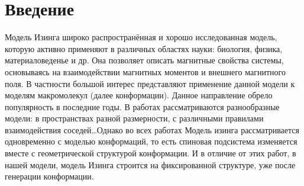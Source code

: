 \section{Введение}
Модель Изинга \cite{ising} широко распространённая и хорошо исследованная модель, которую активно применяют в различных областях науки: биология, физика, материаловеденье и др. Она позволяет описать магнитные свойства системы, основываясь на взаимодействии магнитных моментов и внешнего магнитного поля. В частности большой интерес представляют применение данной модели к моделям макромолекул \cite{SAW_polymer}(далее конформации). Данное направление обрело популярность в последние годы. В работах рассматриваются разнообразные модели: в пространствах разной размерности, с различными правилами взаимодействия соседей\dots Однако во всех работах Модель изинга рассматривается одновременно с моделью конформаций, то есть спиновая подсистема изменяется вместе с геометрической структурой конформации. И в отличие от этих работ, в нашей модели, модель Изинга строится на фиксированной структуре, уже после генерации конформации.

